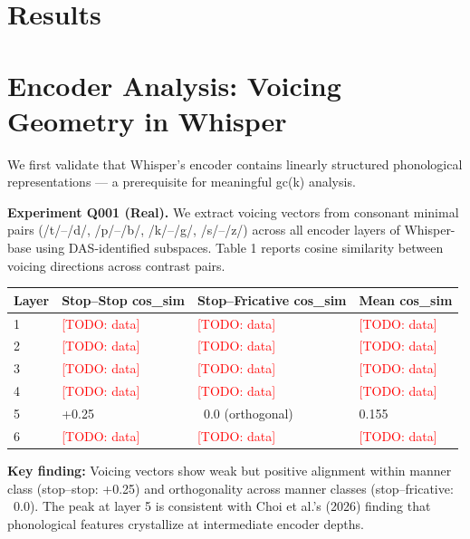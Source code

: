 \documentclass[a4paper]{article}
\begin{document}
\section{Results}




\section{Encoder Analysis: Voicing Geometry in Whisper}

We first validate that Whisper's encoder contains linearly structured phonological representations — a prerequisite for meaningful gc(k) analysis.

\textbf{Experiment Q001 (Real).} We extract voicing vectors from consonant minimal pairs (/t/–/d/, /p/–/b/, /k/–/g/, /s/–/z/) across all encoder layers of Whisper-base using DAS-identified subspaces. Table 1 reports cosine similarity between voicing directions across contrast pairs.

\begin{table}[htbp]
\centering
\begin{tabular}{llll}
\toprule
Layer & Stop–Stop cos_sim & Stop–Fricative cos_sim & Mean cos_sim \\
\midrule
1 & \textcolor{red}{[TODO: data]} & \textcolor{red}{[TODO: data]} & \textcolor{red}{[TODO: data]} \\
2 & \textcolor{red}{[TODO: data]} & \textcolor{red}{[TODO: data]} & \textcolor{red}{[TODO: data]} \\
3 & \textcolor{red}{[TODO: data]} & \textcolor{red}{[TODO: data]} & \textcolor{red}{[TODO: data]} \\
4 & \textcolor{red}{[TODO: data]} & \textcolor{red}{[TODO: data]} & \textcolor{red}{[TODO: data]} \\
5 & +0.25 & ~0.0 (orthogonal) & 0.155 \\
6 & \textcolor{red}{[TODO: data]} & \textcolor{red}{[TODO: data]} & \textcolor{red}{[TODO: data]} \\
\bottomrule
\end{tabular}
\end{table}

\textbf{Key finding:} Voicing vectors show weak but positive alignment within manner class (stop–stop: +0.25) and orthogonality across manner classes (stop–fricative: ~0.0). The peak at layer 5 is consistent with Choi et al.'s (2026) finding that phonological features crystallize at intermediate encoder depths.
\end{document}
